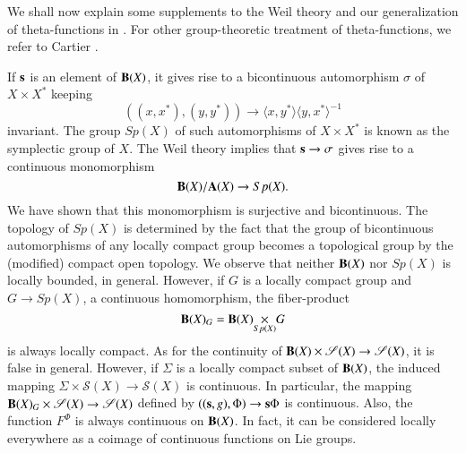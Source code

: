 We shall now explain some supplements to the Weil theory and our generalization of theta-functions in \cite{art12-key13}. For other group-theoretic treatment of theta-functions, we refer to Cartier \cite{art12-key5}.

If $\mathbf{s}$ is an element of $\mathbf{B}(X)$, it gives rise to a bicontinuous automorphism $\sigma$ of $X\times X^{*}$ keeping
$$
((x,x^{*}),(y,y^{*}))\to \langle x,y^{*}\rangle \langle y,x^{*}\rangle^{-1}
$$
invariant. The group $Sp(X)$ of such automorphisms of $X\times X^{*}$ is known as the symplectic group of $X$. The Weil theory implies that $\mathbf{s}\to \sigma$ gives rise to a continuous monomorphism
$$
\mathbf{B}(X)/\mathbf{A}(X)\to Sp(X).
$$\pageoriginale
We have shown that this monomorphism is surjective and bicontinuous. The topology of $Sp(X)$ is determined by the fact that the group of bicontinuous automorphisms of any locally compact group becomes a topological group by the (modified) compact open topology. We observe that neither $\mathbf{B}(X)$ nor $Sp(X)$ is locally bounded, in general. However, if $G$ is a locally compact group and $G\to Sp(X)$, a continuous homomorphism, the fiber-product
$$
\bfB(X)_{G}=\fprod{\bfB(X)}{G}{Sp(X)}
$$
is always locally compact. As for the continuity of $\mathbf{B}(X)\times \mathscr{S}(X)\to \mathscr{S}(X)$, it is false in general. However, if $\Sigma$ is a locally compact subset of $\mathbf{B}(X)$, the induced mapping $\Sigma\times \mathscr{S}(X)\to \mathscr{S}(X)$ is continuous. In particular, the mapping $\mathbf{B}(X)_{G}\times \mathscr{S}(X)\to \mathscr{S}(X)$ defined by $((\mathbf{s},g),\Phi)\to \mathbf{s}\Phi$ is continuous. Also, the function $F^{\Phi}$ is always continuous on $\mathbf{B}(X)$. In fact, it can be considered locally everywhere as a coimage of continuous functions on Lie groups.

